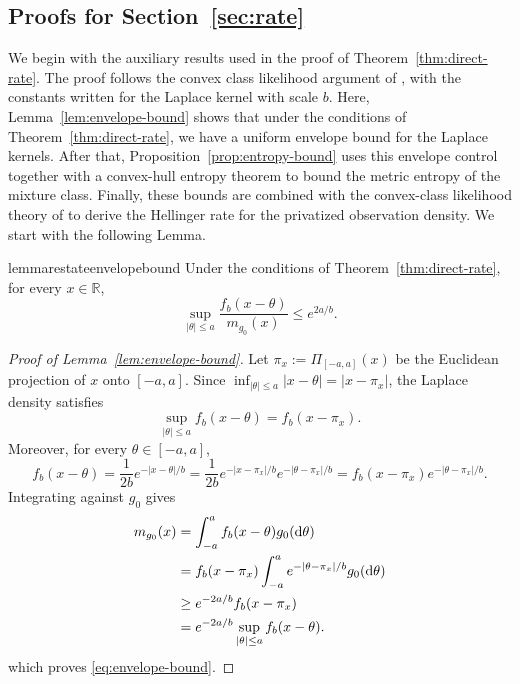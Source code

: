 \documentclass[english, 11pt]{article}
\newcommand{\mrd}{\mathrm{d}}
\theoremstyle{plain}
\theoremstyle{definition}
\theoremstyle{remark}
\begin{document}
\begin{appendix}
\section{Proofs for Section~\ref{sec:rate}}\label{app:rate}

We begin with the auxiliary results used in the proof of Theorem~\ref{thm:direct-rate}. 
The proof follows the convex class likelihood argument of \cite{van1996rates}, with the constants written for the Laplace kernel with scale $b$.
Here, Lemma~\ref{lem:envelope-bound} shows that under the conditions of Theorem~\ref{thm:direct-rate}, we have a uniform envelope bound for the Laplace kernels. 
After that, Proposition~\ref{prop:entropy-bound} uses this envelope control together with a convex-hull entropy theorem to bound the metric entropy of the mixture class. 
Finally, these bounds are combined with the convex-class likelihood theory of \cite{van1996rates} to derive the Hellinger rate for the privatized observation density. 
We start with the following Lemma.

\begin{restatable}{lemma}{restateenvelopebound}\label{lem:envelope-bound}
Under the conditions of Theorem~\ref{thm:direct-rate}, for every $x\in\mathbb R$,
\begin{equation}\label{eq:envelope-bound}
\sup_{|\theta|\le a}\frac{f_b(x-\theta)}{m_{g_0}(x)}\le e^{2a/b}.
\end{equation}
\end{restatable}

\begin{proof}[Proof of Lemma~\ref{lem:envelope-bound}]
Let $\pi_x:=\Pi_{[-a,a]}(x)$ be the Euclidean projection of $x$ onto $[-a,a]$. Since $\inf_{|\theta|\le a}|x-\theta| = |x-\pi_x|$, the Laplace density satisfies
\begin{equation}\label{eq:max-kernel-projection}
\sup_{|\theta|\le a} f_b(x-\theta)=f_b(x-\pi_x).
\end{equation}
Moreover, for every $\theta\in[-a,a]$,
\begin{equation*}
f_b(x-\theta) = \frac{1}{2b}e^{-|x-\theta|/b} = \frac{1}{2b}e^{-|x-\pi_x|/b}e^{-|\theta-\pi_x|/b} = f_b(x-\pi_x)e^{-|\theta-\pi_x|/b}.
\end{equation*}
Integrating against $g_0$ gives
\begin{align}
m_{g_0}(x)
&= \int_{-a}^a f_b(x-\theta) g_0(\mrd \theta) \notag\\
&= f_b(x-\pi_x)\int_{-a}^a e^{-|\theta-\pi_x|/b}g_0(\mrd\theta) \notag\\
&\ge e^{-2a/b} f_b(x-\pi_x) \notag\\
&= e^{-2a/b}\sup_{|\theta|\le a}f_b(x-\theta).
\label{eq:p0-factorization}
\end{align}
which proves \eqref{eq:envelope-bound}.
\end{proof}


\end{appendix}
\end{document}
